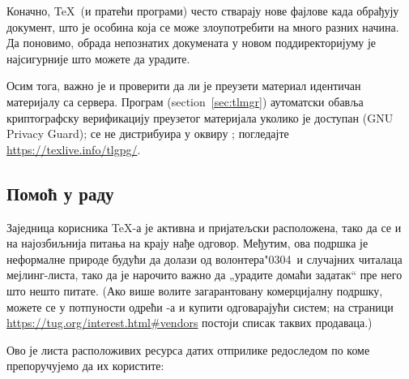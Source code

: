 \documentclass{article}
\begin{document}
Коначно, \TeX\ (и пратећи програми) често стварају нове фајлове када
обрађују документ, што је особина која се може злоупотребити на много
разних начина. Да поновимо, обрада непознатих докумената у новом
поддиректоријуму је најсигурније што можете да урадите.

Осим тога, важно је и проверити да ли је преузети материал идентичан
материјалу са сервера. Програм  (section~\ref{sec:tlmgr})
аутоматски обавља криптографску верификацију преузетог материјала
уколико је доступан  (GNU Privacy Guard);  се не
дистрибуира у оквиру \TL{}; погледајте
\url{https://texlive.info/tlgpg/}.

\subsection{Помоћ у раду}
\label{sec:help}

Заједница корисника \TeX{}-а је активна и пријатељски расположена,
тако да се и на најозбиљнија питања на крају нађе одговор. Међутим,
ова подршка је неформалне природе будући да долази од
волонтера\char"0304\ и случајних читалаца мејлинг-листа, тако да је
нарочито важно да „урадите домаћи задатак“ пре него што нешто питате.
(Ако више волите загарантовану комерцијалну подршку, можете се у
потпуности одрећи \TL{}-а и купити одговарајући систем; на страници
\url{https://tug.org/interest.html#vendors} постоји списак таквих
продаваца.)

Ово је листа расположивих ресурса датих отприлике редоследом по коме
препоручујемо да их користите:
\end{document}
